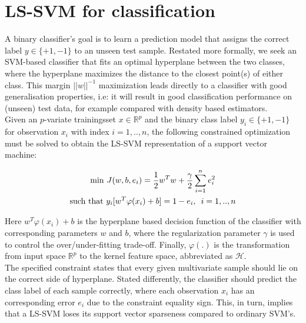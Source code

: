 \documentclass[preprint,12pt]{elsarticle}
\begin{document}
	
	\section{LS-SVM for classification}
	\label{sec:lssvm}
	A binary classifier's goal is to learn a prediction model that assigns the correct label $y \in \{+1, -1\}$ to an unseen test sample. Restated more formally, we seek an SVM-based classifier that fits an optimal hyperplane between the two classes, where the hyperplane maximizes the distance to the closest point(s) of either class. This margin $||w||^{-1}$ maximization leads directly to a classifier with good generalisation properties, i.e: it will result in good classification performance on (unseen) test data, for example compared with density based estimators. \\
	
	
	Given an $p$-variate trainingsset $x \in \mathbb{R}^p$ and the binary class label $y_i \in \{+1,-1\}$ for observation $x_i$ with index $i = 1,..,n$, the following constrained optimization must be solved to obtain the LS-SVM representation of a support vector machine:
	
	\begin{gather}
	\label{eq:costfunction}
	\mathrm{min} \  J(w,b,e_i) = \frac{1}{2} w^T w + \frac{\gamma}{2} \sum_{i=1}^{n} e_i^2 \\
	\label{eq:lsconstraint}
	\textrm{such that } y_i[w^T \varphi(x_i) + b] = 1-e_i, \enskip i = 1,..,n
	\end{gather}
	
	Here $w^T \varphi(x_i) + b$ is the hyperplane based decision function of the classifier with corresponding parameters $w$ and $b$, where the regularization parameter $\gamma$ is used to control the over/under-fitting trade-off. Finally,  $\varphi(.)$ is the transformation from input space $\mathbb{R}^p$ to the kernel feature space, abbreviated as $\mathcal{H}$. \\
	
	The specified constraint states that every given multivariate sample should lie on the correct side of hyperplane. Stated differently, the classifier should predict the class label of each sample correctly, where each observation $x_i$ has an corresponding error $e_i$ due to the constraint equality sign. This, in turn, implies that a LS-SVM loses its support vector sparseness compared to ordinary SVM's. \\
	
\end{document}
